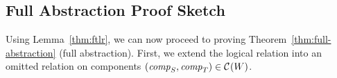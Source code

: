 \documentclass[acmsmall,screen]{acmart}\settopmatter{}
\renewcommand{\npair}[2][n]{#2}
\renewcommand{\lrvg}[2][]{\typesetlr{V}^{#1}_{#2}}
\renewcommand{\lrv}[1][]{\lrvg[#1]{\untrusted}}
\renewcommand{\lrcomp}[1][]{\typesetlr{C}^{#1}}
\renewcommand{\lrheap}[1][]{\typesetlr{H}^{#1}}
\begin{document}
\subsection{Full Abstraction Proof Sketch}
\label{subsec:proof-sketch}
Using Lemma~\ref{thm:ftlr}, we can now proceed to proving Theorem~\ref{thm:full-abstraction} (full abstraction).
First, we extend the logical relation into an omitted relation on components $(\var{comp}_S,\var{comp}_T) \in \lrcomp(W)$.
\end{document}

